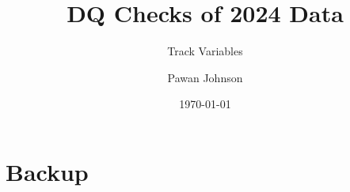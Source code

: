 \documentclass{beamer}
\title{DQ Checks of 2024 Data}
\subtitle{Track Variables}
\author{Pawan Johnson}
\institute{University of Liverpool}
\date{\today}
\begin{document}
\begingroup
{}
\begin{frame}
    \maketitle
\end{frame}
\endgroup








\section{Backup}
\appendix
\appendsubframes
\end{document}
